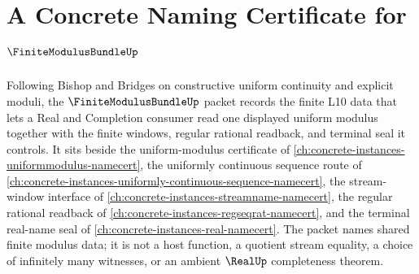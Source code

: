 \chapter{A Concrete Naming Certificate for $\FiniteModulusBundleUp$}
\label{ch:concrete-instances-finite-modulus-bundle-namecert}

Following Bishop and Bridges on constructive uniform continuity and explicit moduli, the $\FiniteModulusBundleUp$ packet records the finite L10 data that lets a Real and Completion consumer read one displayed uniform modulus together with the finite windows, regular rational readback, and terminal seal it controls. It sits beside the uniform-modulus certificate of \autoref{ch:concrete-instances-uniformmodulus-namecert}, the uniformly continuous sequence route of \autoref{ch:concrete-instances-uniformly-continuous-sequence-namecert}, the stream-window interface of \autoref{ch:concrete-instances-streamname-namecert}, the regular rational readback of \autoref{ch:concrete-instances-regseqrat-namecert}, and the terminal real-name seal of \autoref{ch:concrete-instances-real-namecert}. The packet names shared finite modulus data; it is not a host function, a quotient stream equality, a choice of infinitely many witnesses, or an ambient $\RealUp$ completeness theorem.

